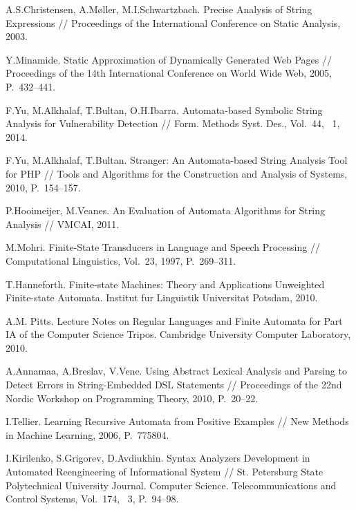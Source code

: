 \begin{thebibliography}{99}
 A.S.Christensen, A.M{\o}ller, M.I.Schwartzbach.
 Precise Analysis of String Expressions //
 Proceedings of the International Conference on Static Analysis, 2003.

 Y.Minamide.
 Static Approximation of Dynamically Generated Web Pages //
 Proceedings of the 14th International Conference on World Wide Web, 2005,
 P.~432--441.

 F.Yu, M.Alkhalaf, T.Bultan, O.H.Ibarra.
 Automata-based Symbolic String Analysis for Vulnerability Detection //
 Form. Methods Syst. Des., Vol.~44, \textnumero~1, 2014.

 F.Yu, M.Alkhalaf, T.Bultan.
 Stranger: An Automata-based String Analysis Tool for PHP //
 Tools and Algorithms for the Construction and Analysis of Systems, 2010,
 P.~154--157.

 P.Hooimeijer, M.Veanes.
 An Evaluation of Automata Algorithms for String Analysis //
 VMCAI, 2011.

 M.Mohri. Finite-State Transducers in Language and Speech Processing //
 Computational Linguistics, Vol.~23, 1997, P.~269--311.

  T.Hanneforth.
  Finite-state Machines: Theory and Applications Unweighted Finite-state Automata.
  Institut fur Linguistik Universitat Potsdam, 2010.

  A.M. Pitts. Lecture Notes on Regular Languages and Finite Automata for 
  Part IA of the Computer Science Tripos.
  Cambridge University Computer Laboratory, 2010.

  A.Annamaa, A.Breslav, V.Vene.
  Using Abstract Lexical Analysis and Parsing to Detect Errors in String-Embedded DSL Statements //
  Proceedings of the 22nd Nordic Workshop on Programming Theory, 2010, P.~20--22.

  I.Tellier. Learning Recursive Automata from Positive Examples //
  New Methods in Machine Learning, 2006,  P.~775804.

 I.Kirilenko, S.Grigorev, D.Avdiukhin.
 Syntax Analyzers Development in Automated Reengineering of Informational System //
 St. Petersburg State Polytechnical University Journal. Computer Science. Telecommunications and Control Systems,
 Vol.~174, \textnumero~3, P.~94--98.
\end{thebibliography}
